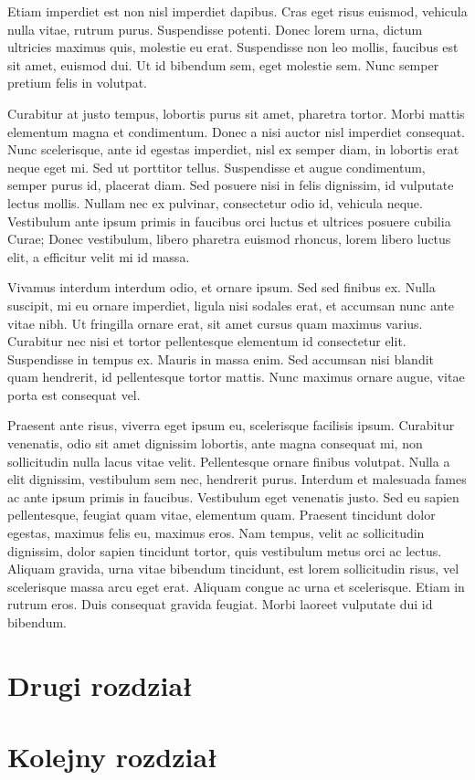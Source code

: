 \documentclass[a4paper,12pt,polish,twoside]{extreport}
\begin{document}
Etiam imperdiet est non nisl imperdiet dapibus. Cras eget risus euismod, vehicula nulla vitae, rutrum purus. Suspendisse potenti. Donec lorem urna, dictum ultricies maximus quis, molestie eu erat. Suspendisse non leo mollis, faucibus est sit amet, euismod dui. Ut id bibendum sem, eget molestie sem. Nunc semper pretium felis in volutpat.

Curabitur at justo tempus, lobortis purus sit amet, pharetra tortor. Morbi mattis elementum magna et condimentum. Donec a nisi auctor nisl imperdiet consequat. Nunc scelerisque, ante id egestas imperdiet, nisl ex semper diam, in lobortis erat neque eget mi. Sed ut porttitor tellus. Suspendisse et augue condimentum, semper purus id, placerat diam. Sed posuere nisi in felis dignissim, id vulputate lectus mollis. Nullam nec ex pulvinar, consectetur odio id, vehicula neque. Vestibulum ante ipsum primis in faucibus orci luctus et ultrices posuere cubilia Curae; Donec vestibulum, libero pharetra euismod rhoncus, lorem libero luctus elit, a efficitur velit mi id massa.

Vivamus interdum interdum odio, et ornare ipsum. Sed sed finibus ex. Nulla suscipit, mi eu ornare imperdiet, ligula nisi sodales erat, et accumsan nunc ante vitae nibh. Ut fringilla ornare erat, sit amet cursus quam maximus varius. Curabitur nec nisi et tortor pellentesque elementum id consectetur elit. Suspendisse in tempus ex. Mauris in massa enim. Sed accumsan nisi blandit quam hendrerit, id pellentesque tortor mattis. Nunc maximus ornare augue, vitae porta est consequat vel.

Praesent ante risus, viverra eget ipsum eu, scelerisque facilisis ipsum. Curabitur venenatis, odio sit amet dignissim lobortis, ante magna consequat mi, non sollicitudin nulla lacus vitae velit. Pellentesque ornare finibus volutpat. Nulla a elit dignissim, vestibulum sem nec, hendrerit purus. Interdum et malesuada fames ac ante ipsum primis in faucibus. Vestibulum eget venenatis justo. Sed eu sapien pellentesque, feugiat quam vitae, elementum quam. Praesent tincidunt dolor egestas, maximus felis eu, maximus eros. Nam tempus, velit ac sollicitudin dignissim, dolor sapien tincidunt tortor, quis vestibulum metus orci ac lectus. Aliquam gravida, urna vitae bibendum tincidunt, est lorem sollicitudin risus, vel scelerisque massa arcu eget erat. Aliquam congue ac urna et scelerisque. Etiam in rutrum eros. Duis consequat gravida feugiat. Morbi laoreet vulputate dui id bibendum.

\chapter{Drugi rozdział}

\chapter{Kolejny rozdział}

\newpage
\printbibliography[heading=bibintoc,title={Bibliografia}]

\newpage
\listoffigures

\newpage
\listofcodes

\newpage
\renewcommand{\listtablename}{Spis tabel}
\listoftables
\end{document}
